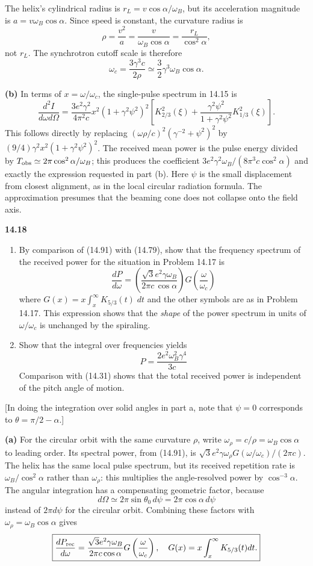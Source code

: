 The helix's cylindrical radius is $r_L=v\cos\alpha/\omega_B$,
but its acceleration magnitude is $a=v\omega_B\cos\alpha$.
Since speed is constant, the curvature radius is
\[
\rho=\frac{v^2}{a}=\frac v{\omega_B\cos\alpha}
=\frac{r_L}{\cos^2\alpha},
\]
not $r_L$. The synchrotron cutoff scale is therefore
\[
\boxed{\omega_c=\frac{3\gamma^3c}{2\rho}
\simeq\frac32\gamma^3\omega_B\cos\alpha.}
\]

\textbf{(b)} In terms of $x=\omega/\omega_c$, the single-pulse spectrum
in 14.15 is
\[
\frac{d^2I}{d\omega d\Omega}
=\frac{3e^2\gamma^2}{4\pi^2c}x^2(1+\gamma^2\psi^2)^2
\left[K_{2/3}^2(\xi)+\frac{\gamma^2\psi^2}{1+\gamma^2\psi^2}
K_{1/3}^2(\xi)\right].
\]
This follows directly by replacing
$(\omega\rho/c)^2(\gamma^{-2}+\psi^2)^2$
by $(9/4)\gamma^2x^2(1+\gamma^2\psi^2)^2$.
The received mean power is the pulse energy divided by
$T_{\rm obs}\simeq2\pi\cos^2\alpha/\omega_B$; this produces the
coefficient $3e^2\gamma^2\omega_B/(8\pi^3c\cos^2\alpha)$ and exactly
the expression requested in part (b).
Here $\psi$ is the small displacement from closest alignment, as in the
local circular radiation formula. The approximation presumes that the
beaming cone does not collapse onto the field axis.

\par\bigskip
\noindent\textbf{14.18}\quad\begin{enumerate}
\item[(a)] By comparison of (14.91) with (14.79), show that the frequency spectrum of the received power for the situation in Problem 14.17 is
\[
\frac{dP}{d\omega}=\left(\frac{\sqrt{3}e^{2}\gamma\omega_{B}}{2\pi c\,\cos\alpha}\right)\!G\!\left(\frac{\omega}{\omega_{c}}\right)
\]
where $G(x)=x\displaystyle\int_{x}^{\infty}K_{5/3}(t)\;dt$ and the other symbols are as in Problem 14.17. This expression shows that the \emph{shape} of the power spectrum in units of $\omega/\omega_{c}$ is unchanged by the spiraling.
\item[(b)] Show that the integral over frequencies yields
\[
P=\frac{2e^{2}\omega_{B}^{2}\gamma^{4}}{3c}
\]
Comparison with (14.31) shows that the total received power is independent of the pitch angle of motion.
\end{enumerate}
[In doing the integration over solid angles in part a, note that $\psi=0$ corresponds to $\theta=\pi/2-\alpha$.]
\solution

\textbf{(a)} For the circular orbit with the same curvature $\rho$,
write $\omega_{\rho}=c/\rho=\omega_B\cos\alpha$ to leading order.
Its spectral power, from (14.91), is
$\sqrt3e^2\gamma\omega_{\rho}G(\omega/\omega_c)/(2\pi c)$.
The helix has the same local pulse spectrum, but its received repetition
rate is $\omega_B/\cos^2\alpha$ rather than $\omega_{\rho}$: this
multiplies the angle-resolved power by $\cos^{-3}\alpha$.
The angular integration has a compensating geometric factor, because
\[
d\Omega\simeq2\pi\sin\theta_0\,d\psi
=2\pi\cos\alpha\,d\psi
\]
instead of $2\pi d\psi$ for the circular orbit. Combining these factors
with $\omega_{\rho}=\omega_B\cos\alpha$ gives
\[
\boxed{\frac{dP_{\rm rec}}{d\omega}
=\frac{\sqrt3e^2\gamma\omega_B}{2\pi c\cos\alpha}
G\left(\frac\omega{\omega_c}\right),\quad
G(x)=x\int_x^\infty K_{5/3}(t)dt.}
\]

